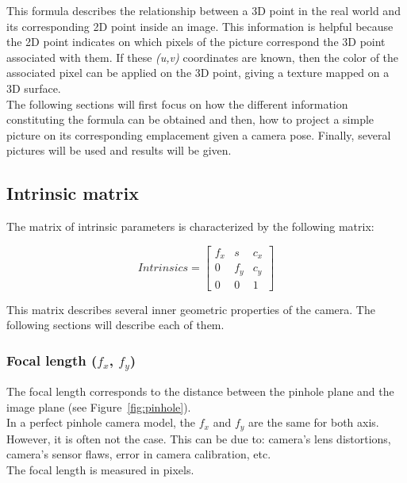 This formula describes the relationship between a 3D point in the real world and its corresponding 2D point inside an image. This information is helpful because the 2D point indicates on which pixels of the picture correspond the 3D point associated with them. If these \textit{(u,v)} coordinates are known, then the color of the associated pixel can be applied on the 3D point, giving a texture mapped on a 3D surface.\\

The following sections will first focus on how the different information constituting the formula can be obtained and then, how to project a simple picture on its corresponding emplacement given a camera pose. Finally, several pictures will be used and results will be given.\\

\subsection{Intrinsic matrix}

The matrix of intrinsic parameters is characterized by the following matrix:

\begin{equation}
  Intrinsics = \begin{bmatrix}
       f_x & s & c_x \\
       0 & f_y & c_y \\
       0 & 0 & 1
     \end{bmatrix}   
\end{equation}

This matrix describes several inner geometric properties of the camera. The following sections will describe each of them. 

\subsubsection{Focal length ($f_x$, $f_y$)}
The focal length corresponds to the distance between the pinhole plane and the image plane (see Figure~\ref{fig:pinhole}).\\

In a perfect pinhole camera model, the $f_x$ and $f_y$ are the same for both axis. However, it is often not the case. This can be due to: camera's lens distortions, camera's sensor flaws, error in camera calibration, etc.\\ 

The focal length is measured in pixels.\\


